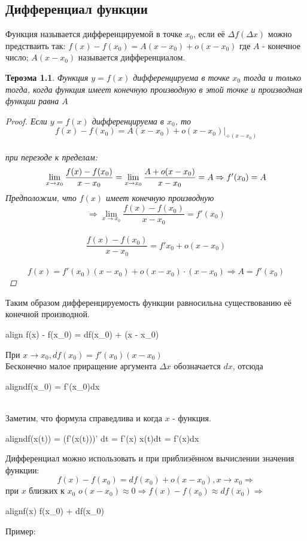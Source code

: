 \documentclass[oneside]{book}
\newcommand{\boxedeq}[2]{\begin{empheq}[box={\fboxsep=6pt\fbox}]{align}\label{#1}#2\end{empheq}}
\newtheorem{thm}{Тероэма}[chapter] %
\begin{document}
\begin{enumerate}
\begin{itemize}
\chapter{Дифференциал функции}

Функция называется дифференцируемой в точке $x_0$, если её $\Delta f(\Delta x)$ можно предстваить так:
$f(x) - f(x_0) = A(x - x_0) + o(x - x_0)$ где $A$ - конечное число; $A(x - x_0)$ называется дифференциалом.
\begin{thm}
    Функция $y = f(x)$ дифференцируема в точке $x_0$ тогда и только тогда, когда функция имеет конечную производную в этой точке
    и производная функции равна $A$
    \begin{proof}
      Если $y = f(x)$ дифференцируема в $x_0$, то
      $$f(x) - f(x_0) = A(x-x_0) + o(x - x_0)\vert_{\div (x - x_0)}$$ \\
      при перезоде к пределам:
      $$\lim_{x \rightarrow x_0}{\frac{f(x) - f(x_0)}{x - x_0}} = \lim_{x \rightarrow x_0}{\frac{A+o(x-x_0)}{x-x_0}} = \large{A} \Rightarrow f'(x_0) = A$$
		Предположим, что $f(x)$ имеет конечную производную $$ \Rightarrow \lim_{x \rightarrow x_0}{\frac{f(x) - f(x_0)}{x - x_0}} =
		f'(x_0)$$ \\
		$$\frac{f(x) - f(x_0)}{x - x_0} = f'{x_0} + o(x-x_0)$$ \\ $$
		f(x) = f'(x_0)(x - x_0) + o(x-x_0) \cdot (x-x_0) \Rightarrow A = f'(x_0)$$
    \end{proof}
\end{thm}
Таким образом дифференцируемость функции равносильна существованию её конечной производной.
\boxedeq{eq:*}{ f(x) - f(x_0) = df(x_0) + (x - x_0)}
При $x \rightarrow x_0, df(x_0) = f'(x_0)(x - x_0)$ \\
Бесконечно малое приращение аргумента $\Delta x$ обозначается $dx$, отсюда
\boxedeq{eq:*}{df(x_0) = f'(x_0)dx} \\

Заметим, что формула справедлива и когда $x$ - функция.
\boxedeq{eq:*}{df(x(t)) = (f'(x(t)))' dt = f'(x) \cdot x(t)dt = f'(x)dx}

Дифференциал можно использовать и при приблиэённом вычислении значения функции:\\
$$f(x) - f(x_0) = df(x_0) + o(x - x_0), x \rightarrow x_0 \Rightarrow$$ при $x$ близких к $x_0$
$o(x- x_0) \approx 0 \Rightarrow f(x) - f(x_0) \approx df(x_0) \Rightarrow$ \\
\boxedeq{eq:*}{f(x) \approx f(x_0) + df(x_0)}
\begin{center}
  Пример:
\end{center}


\end{itemize}
\end{enumerate}
\end{document}
